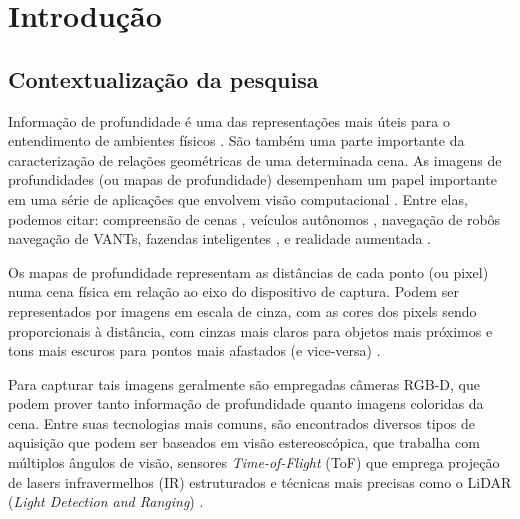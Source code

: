
\chapter{Introdução}

\section{Contextualização da pesquisa}

Informação de profundidade é uma das representações mais úteis para o entendimento de ambientes físicos \cite{lasinger2019towards} \cite{zhou2019does}. São também uma parte importante da caracterização de relações geométricas de uma determinada cena. As imagens de profundidades (ou mapas de profundidade) desempenham um papel importante em uma série de aplicações que envolvem visão computacional \cite{eigen2014depth}.  Entre elas, podemos citar: compreensão de cenas \cite{jaritz2018sparse}, veículos autônomos \cite{song2021self}, navegação de robôs \cite{ma2019sparse} navegação de VANTs, \cite{padhy2023monocular} fazendas inteligentes \cite{farkhani2019sparse}, e realidade aumentada \cite{du2020depthlab}. 


Os mapas de profundidade representam as distâncias de cada ponto (ou pixel) numa cena física em relação ao eixo do dispositivo de captura. Podem ser representados por imagens em escala de cinza, com as cores dos pixels sendo proporcionais à distância, com cinzas mais claros para objetos mais próximos e tons mais escuros para pontos mais afastados (e vice-versa) \cite{dourado2020multi}.



Para capturar tais imagens geralmente são empregadas câmeras RGB-D, que podem prover tanto informação de profundidade quanto imagens coloridas da cena. Entre suas tecnologias mais comuns, são encontrados diversos tipos de aquisição que podem ser baseados em visão estereoscópica, que trabalha com múltiplos ângulos de visão, sensores \textit{Time-of-Flight} (ToF) que emprega projeção de lasers infravermelhos (IR) estruturados e técnicas mais precisas como o LiDAR (\textit{Light Detection and Ranging}) \cite{castellano2023performance}.




